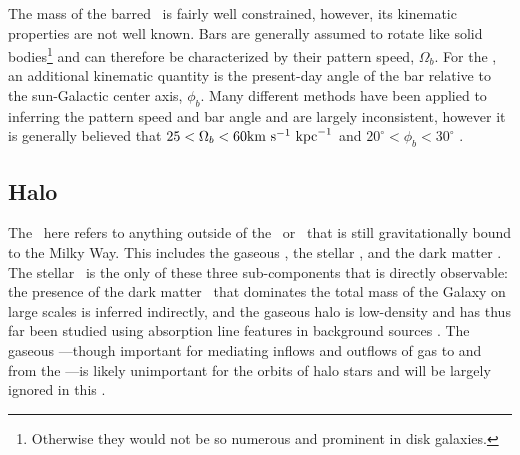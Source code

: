 The mass of the barred \mwbulge\ is fairly well constrained, however, its kinematic properties are not well known. Bars are generally assumed to rotate like solid bodies\footnote{Otherwise they would not be so numerous and prominent in disk galaxies.} and can therefore be characterized by their pattern speed, $\Omega_b$. For the \mwbulge, an additional kinematic quantity is the present-day angle of the bar relative to the sun-Galactic center axis, $\phi_b$. Many different methods have been applied to inferring the pattern speed and bar angle and are largely inconsistent, however it is generally believed that $25 < \Omega_b < 60 \mathrm{km}~\mathrm{s}^{-1}~\mathrm{kpc}^{-1}$ and $20^\circ < \phi_b < 30^\circ$ \citep{dwek95, stanek97, debattista02, shen10, wegg13, cao13, wegg15, portail15}.


\subsection{Halo}\label{sec:mw-halo}

The \mwhalo\ here refers to anything outside of the \mwdisk\ or \mwbulge\ that is still gravitationally bound to the Milky Way. This includes the gaseous \mwhalo, the stellar \mwhalo, and the dark matter \mwhalo. The stellar \mwhalo\ is the only of these three sub-components that is directly observable: the presence of the dark matter \mwhalo\ that dominates the total mass of the Galaxy on large scales is inferred indirectly, and the gaseous halo is low-density and has thus far been studied using absorption line features in background sources \citep{miller13}. The gaseous \mwhalo---though important for mediating inflows and outflows of gas to and from the \mwdisk---is likely unimportant for the orbits of halo stars and will be largely ignored in this \article. %

